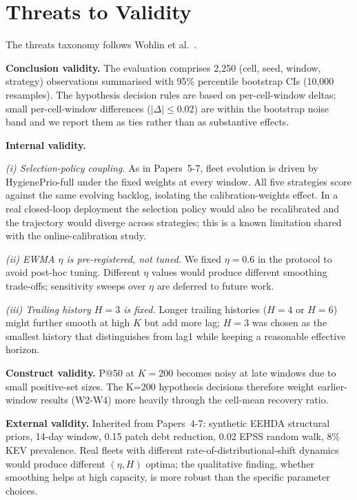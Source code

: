 \section{Threats to Validity}
\label{sec:threats}

The threats taxonomy follows Wohlin et al.~\cite{wohlin2012experimentation}.

\textbf{Conclusion validity.} The evaluation comprises 2{,}250
(cell, seed, window, strategy) observations summarised with 95\%
percentile bootstrap CIs (10{,}000 resamples). The hypothesis decision
rules are based on per-cell-window deltas; small per-cell-window
differences ($|\Delta| \leq 0.02$) are within the bootstrap noise band
and we report them as ties rather than as substantive effects.

\textbf{Internal validity.}

\textit{(i) Selection-policy coupling.} As in Papers~5-7, fleet
evolution is driven by HygienePrio-full under the \textsf{fixed}
weights at every window. All five strategies score against the same
evolving backlog, isolating the calibration-weights effect. In a real
closed-loop deployment the selection policy would also be recalibrated
and the trajectory would diverge across strategies; this is a known
limitation shared with the online-calibration study.

\textit{(ii) EWMA $\eta$ is pre-registered, not tuned.} We fixed
$\eta = 0.6$ in the protocol to avoid post-hoc tuning. Different
$\eta$ values would produce different smoothing trade-offs;
sensitivity sweeps over $\eta$ are deferred to future work.

\textit{(iii) Trailing history $H = 3$ is fixed.} Longer trailing
histories ($H = 4$ or $H = 6$) might further smooth at high $K$ but
add more lag; $H = 3$ was chosen as the smallest history that
distinguishes from \textsf{lag1} while keeping a reasonable
effective horizon.

\textbf{Construct validity.} P@50 at $K = 200$ becomes noisy at late
windows due to small positive-set sizes. The K=200 hypothesis decisions
therefore weight earlier-window results (W2-W4) more heavily through
the cell-mean recovery ratio.

\textbf{External validity.} Inherited from Papers~4-7: synthetic
EEHDA structural priors, 14-day window, 0.15 patch debt reduction,
0.02 EPSS random walk, 8\% KEV prevalence. Real fleets with different
rate-of-distributional-shift dynamics would produce different
$(\eta, H)$ optima; the qualitative finding, whether smoothing
helps at high capacity, is more robust than the specific parameter
choices.
